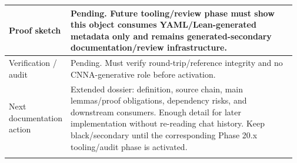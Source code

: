 \begin{longtable}{L{0.16\linewidth} L{0.81\linewidth}}
\hline\addlinespace[0.20em]
Proof sketch & Pending. Future tooling/\allowbreak{}review phase must show this object consumes YAML/\allowbreak{}Lean-generated metadata only and remains generated-secondary documentation/\allowbreak{}review infrastructure.\\
\hline\addlinespace[0.20em]
Verification /\allowbreak{} audit & Pending. Must verify round-trip/\allowbreak{}reference integrity and no CNNA-generative role before activation.\\
\hline\addlinespace[0.20em]
Next documentation action & Extended dossier: definition, source chain, main lemmas/\allowbreak{}proof obligations, dependency risks, and downstream consumers. Enough detail for later implementation without re-reading chat history. Keep black/\allowbreak{}secondary until the corresponding Phase 20.x tooling/\allowbreak{}audit phase is activated.\\
\hline\addlinespace[0.20em]
\end{longtable}
